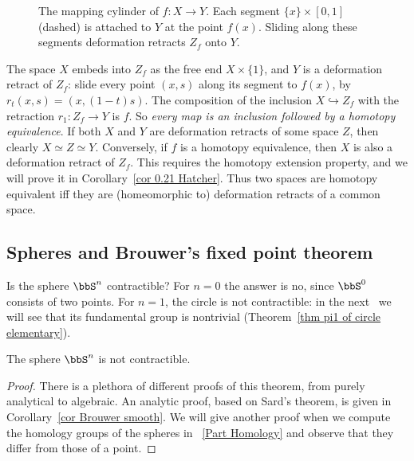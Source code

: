 \begin{figure}[tp]
    \centering
    \caption{The mapping cylinder of $f:X\to Y$. Each segment $\{x\}\times[0,1]$ (dashed) is attached to $Y$ at the point $f(x)$. Sliding along these segments deformation retracts $Z_f$ onto $Y$.}
    \label{fig mapping cylinder}
\end{figure}

The space $X$ embeds into $Z_f$ as the free end $X\times\{1\}$, and $Y$ is a deformation retract of $Z_f$: slide every point $(x,s)$ along its segment to $f(x)$, by $r_t(x,s)=(x,(1-t)s)$. The composition of the inclusion $X\hookrightarrow Z_f$ with the retraction $r_1:Z_f\to Y$ is $f$. So \emph{every map is an inclusion followed by a homotopy equivalence}. If both $X$ and $Y$ are deformation retracts of some space $Z$, then clearly $X\simeq Z\simeq Y$. Conversely, if $f$ is a homotopy equivalence, then $X$ is also a deformation retract of $Z_f$. This requires the homotopy extension property, and we will prove it in Corollary~\ref{cor 0.21 Hatcher}. Thus two spaces are homotopy equivalent iff they are (homeomorphic to) deformation retracts of a common space.


\subsection{Spheres and Brouwer's fixed point theorem}

Is the sphere $\bbS^n$ contractible? For $n=0$ the answer is no, since $\bbS^0$ consists of two points. For $n=1$, the circle is not contractible: in the next \sect\ we will see that its fundamental group is nontrivial (Theorem~\ref{thm pi1 of circle elementary}).

\begin{thm}\label{thm spheres not contractible}
    The sphere $\bbS^n$ is not contractible.
\end{thm}
\begin{proof}
    There is a plethora of different proofs of this theorem, from purely analytical to algebraic. An analytic proof, based on Sard's theorem, is given in Corollary~\ref{cor Brouwer smooth}. We will give another proof when we compute the homology groups of the spheres in \Part~\ref{Part Homology} and observe that they differ from those of a point.
\end{proof}

